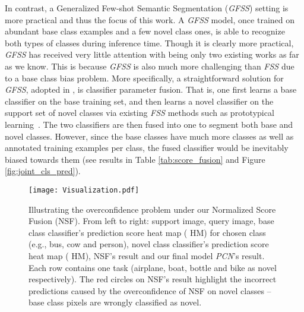 \documentclass[journal]{IEEEtran}
\begin{document}
In contrast, a Generalized Few-shot Semantic Segmentation (\textit{GFSS}) setting is more practical and thus the focus of this work. 
A \textit{GFSS} model, once trained on abundant base class examples and a few novel class ones, is able to recognize both types of classes during inference time. Though it is clearly more practical, \textit{GFSS} has received very little attention with  \cite{liu2020dynamic,tian2020generalized} being only two existing works as far as we know. This is because \textit{GFSS} is also much more challenging than \textit{FSS} due to a base class bias problem. More specifically, a straightforward solution for \textit{GFSS}, adopted in \cite{liu2020dynamic,tian2020generalized}, is classifier parameter fusion. That is, one first learns a base classifier on the base training set, and then learns a novel classifier on the support set of novel classes via existing \textit{FSS} methods such as prototypical learning~\cite{dong2018few,liu2020part,wang2019panet}. The two classifiers are then fused into one to segment both base and novel classes. 
However, since the base classes have much more classes as well as annotated training examples per class, the fused classifier would be inevitably biased towards them (see results in Table \ref{tab:score_fusion} and Figure \ref{fig:joint_cls_pred}).

\begin{figure*}[ht]
    \centering
    \texttt{[image: Visualization.pdf]}
    \caption{Illustrating the overconfidence problem under our Normalized Score Fusion (NSF). From left to right: support image, query image, base class classifier's prediction score heat map ( HM) for chosen class (e.g., bus, cow and person), novel class classifier's prediction score heat map ( HM), NSF's result and our final model \textit{PCN}'s result. Each row contains one task (airplane, boat, bottle and bike as novel respectively). The red circles on NSF's result highlight the incorrect predictions caused by the overconfidence of NSF on novel classes -- base class pixels are  wrongly classified as novel.}
    \label{fig:visacm}
\end{figure*}
\end{document}

